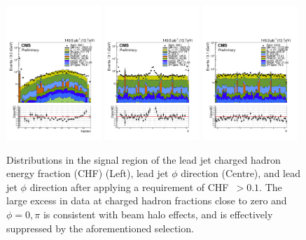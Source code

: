 \begin{figure}[h!]
    \begin{center}
        {\includegraphics[width=0.32\textwidth]{figures/selection/leadJetChf_all_before.pdf}}
        {\includegraphics[width=0.32\textwidth]{figures/selection/leadJetPhi_all_before.pdf}}
        {\includegraphics[width=0.32\textwidth]{figures/selection/leadJetPhi_all_after.pdf}}
        \caption{Distributions in the signal region of the lead jet charged hadron
        energy fraction (CHF) (Left), lead jet $\phi$ direction (Centre), and lead jet $\phi$
        direction after applying a requirement of {CHF~$>0.1$}. The large excess in data
        at charged hadron fractions close to zero and ${\phi = 0, \pi}$ is consistent with beam
        halo effects, and is effectively suppressed by the aforementioned selection.}
        \label{fig:leadJetCleaning}
    \end{center}
\end{figure}


